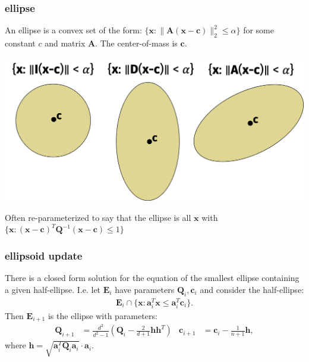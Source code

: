 \documentclass[compress]{beamer}
\newcommand{\bv}[1]{\mathbf{#1}}
\begin{document}
\begin{frame}
		\frametitle{ellipse}
		An ellipse is a convex set of the form: $\{\bv{x}: \|\bv{A}(\bv{x} - \bv{c})\|_2^2 \leq \alpha\}$ for some constant $c$ and matrix $\bv{A}$. The center-of-mass is  $\bv{c}$. 
		\begin{center}
			\includegraphics[width=\textwidth]{ellipses.png}
		\end{center}
	
	Often re-parameterized to say that the ellipse is all $\bv{x}$ with $\{\bv{x}: (\bv{x} - \bv{c})^T\bv{Q}^{-1}(\bv{x} - \bv{c})\leq 1\}$
\end{frame}

\begin{frame}
	\frametitle{ellipsoid update}
	There is a closed form solution for the equation of the smallest ellipse containing a given half-ellipse. I.e. let $\bv{E}_i$ have parameters $\bv{Q}_i,\bv{c}_i$ and consider the half-ellipse:
	\begin{align*}
		\bv{E}_i \cap \{\bv{x}: \bv{a}_i^T\bv{x} \leq \bv{a}_i^T\bv{c}_i\}. 
	\end{align*}
Then $\bv{E}_{i+1}$ is the ellipse with parameters:
\begin{align*}
	\bv{Q}_{i+1} &= \frac{d^2}{d^2 - 1}\left(\bv{Q}_{i} - \frac{2}{d+1} \bv{h}\bv{h}^T \right) & \bv{c}_{i+1}& = \bv{c}_{i} - \frac{1}{n+1}\bv{h},
\end{align*}
where $\bv{h} = \sqrt{\bv{a}_i^T\bv{Q}_i\bv{a}_i}\cdot \bv{a}_i$. 
	
\end{frame}
\end{document}
